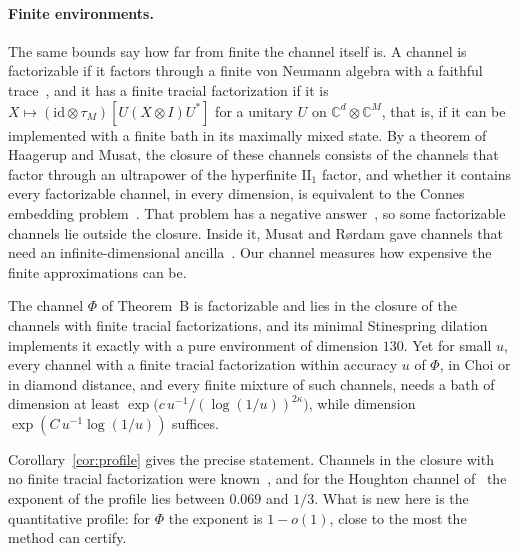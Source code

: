 \paragraph{Finite environments.} The same bounds say how far from finite the channel itself is. A channel is factorizable if it factors through a finite von Neumann algebra with a faithful trace~\cite{AD2006,HaagerupMusat2011},
and it has a finite tracial factorization if it is $X\mapsto(\mathrm{id}\otimes\tau_M)[U(X\otimes I)U^*]$ for a unitary $U$ on $\mathbb C^d\otimes\mathbb C^M$, that is, if
it can be implemented with a finite bath in its maximally mixed state. By a theorem of Haagerup and Musat, the closure of these channels
consists of the channels that factor through an ultrapower of the hyperfinite $\mathrm{II}_1$ factor, and whether it contains every
factorizable channel, in every dimension, is equivalent to the Connes embedding problem~\cite[Theorems~3.6 and~3.7]{HaagerupMusat2015}.
That problem has a negative answer~\cite{JNVWY2020}, so some factorizable channels lie outside the closure. Inside it, Musat and R{\o}rdam
gave channels that need an infinite-dimensional ancilla~\cite{MusatRordam2020}. Our channel measures how expensive the finite
approximations can be.

\begin{theoremC}
The channel $\Phi$ of Theorem~B is factorizable and lies in the closure of the channels with finite tracial factorizations, and its minimal
Stinespring dilation implements it exactly with a pure environment of dimension $130$. Yet for small $u$, every channel with a finite tracial factorization within
accuracy $u$ of $\Phi$, in Choi or in diamond distance, and every finite mixture of such channels, needs a bath of dimension at least
$\exp\bigl(c\,u^{-1}/(\log(1/u))^{2\kappa}\bigr)$, while dimension $\exp(C\,u^{-1}\log(1/u))$ suffices.
\end{theoremC}

Corollary~\ref{cor:profile} gives the precise statement. Channels in the closure with no finite tracial factorization were
known~\cite{MusatRordam2020}, and for the Houghton channel of~\cite[Theorem~D.1]{DouglasMghirbiB} the exponent of the profile lies between
$0.069$ and $1/3$. What is new here is the quantitative profile: for $\Phi$ the exponent is $1-o(1)$, close to the most the method can
certify.

